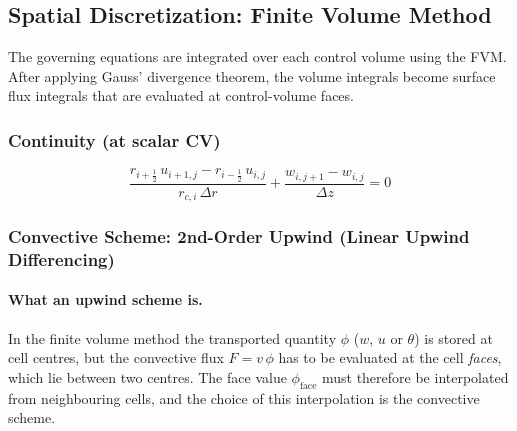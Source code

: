 \documentclass[12pt,a4paper]{article}
\begin{document}
\subsection{Spatial Discretization: Finite Volume Method}

The governing equations are integrated over each control volume using the FVM.
After applying Gauss' divergence theorem, the volume integrals become surface flux integrals that are evaluated at control-volume faces.

\subsubsection{Continuity (at scalar CV)}

\begin{equation}
    \frac{r_{i+\frac{1}{2}}\,u_{i+1,j} - r_{i-\frac{1}{2}}\,u_{i,j}}{r_{c,i}\,\Delta r}
    + \frac{w_{i,j+1} - w_{i,j}}{\Delta z} = 0
    \label{eq:div_discrete}
\end{equation}

\subsubsection{Convective Scheme: 2nd-Order Upwind (Linear Upwind Differencing)}

\paragraph{What an upwind scheme is.} In the finite volume method the transported quantity
$\phi$ ($w$, $u$ or $\theta$) is stored at cell centres, but the convective flux
$F=v\,\phi$ has to be evaluated at the cell \emph{faces}, which lie between two centres. The
face value $\phi_{\text{face}}$ must therefore be interpolated from neighbouring cells, and the
choice of this interpolation is the convective scheme.
\end{document}
